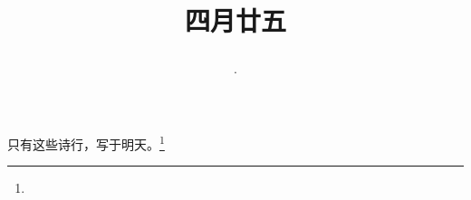 \title{\date[d=1,m=6,y=2024][year:cn-y,年,month:cn,day:cn,日,·,weekday]·四月廿五 }
只有这些诗行，写于明天。\footnote{ }

